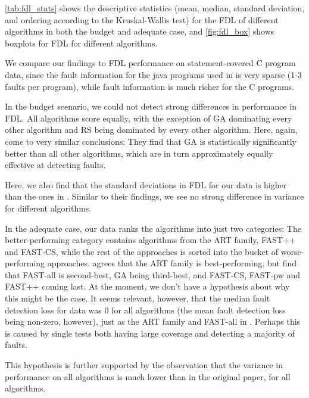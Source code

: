 \autoref{tab:fdl_stats} shows the descriptive statistics (mean, median,
standard deviation, and ordering according to the Kruskal-Wallis test)
for the FDL of different algorithms in both the budget and adequate case,
and \autoref{fig:fdl_box} shows boxplots for FDL for different algorithms.

We compare our findings to FDL performance on statement-covered C
program data, since the fault information for the java programs used
in \cite{cruciani2019scalable} is very sparse (1-3 faults per program),
while fault information is much richer for the C programs.

In the budget scenario, we could not detect strong differences in
performance in FDL. All algorithms score equally, with the exception
of GA dominating every other algorithm and RS being dominated by every
other algorithm. Here, again, \cite{cruciani2019scalable} come to very
similar conclusions: They find that GA is statistically significantly
better than all other algorithms, which are in turn approximately equally
effective at detecting faults.

Here, we also find that the standard deviations in FDL for our data
is higher than the ones in \cite{cruciani2019scalable}. Similar to
their findings, we see no strong difference in variance for different
algorithms.

In the adequate case, our data ranks the algorithms into just two
categories: The better-performing category contains algorithms
from the ART family, FAST++ and FAST-CS, while the rest of
the approaches is sorted into the bucket of worse-performing
approaches. \cite{cruciani2019scalable} agrees that the ART family
is best-performing, but find that FAST-all is second-best, GA being
third-best, and FAST-CS, FAST-pw and FAST++ coming last. At the moment,
we don't have a hypothesis about why this might be the case. It seems
relevant, however, that the median fault detection loss for data was 0 for
all algorithms (the mean fault detection loss being non-zero, however),
just as the ART family and FAST-all in \cite{cruciani2019scalable}.
Perhaps this is caused by single tests both having large coverage and
detecting a majority of faults.

This hypothesis is further supported by the observation that the variance
in performance on all algorithms is much lower than in the original paper,
for all algorithms.

